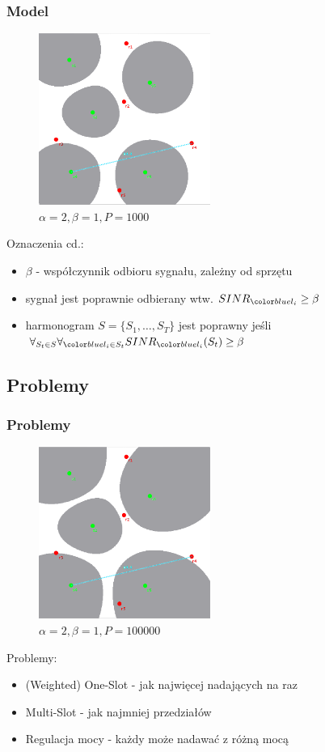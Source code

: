 \documentclass[polish, t,10pt]{beamer}
\begin{document}
    \begin{frame}
        \frametitle{Model}
        \begin{figure}
            \includegraphics[width=0.5\textwidth]{pictures/model-diagram3.png}
            \caption{$\alpha=2, \beta=1, P=1000$}
        \end{figure}
        Oznaczenia cd.:
        \begin{itemize}
            \item $\beta$ - współczynnik odbioru sygnału, zależny od sprzętu
            \item sygnał jest poprawnie odbierany wtw. $SINR_{\li} \geq \beta$
            \item harmonogram $S = \{S_1, \ldots, S_T\}$ jest poprawny jeśli $\forall_{S_t \in S} \forall_{\li \in S_t} SINR_{\li}(S_t) \geq \beta$
        \end{itemize}
    \end{frame}
\subsection{Problemy}
    \begin{frame}
        \frametitle{Problemy}
        \begin{figure}
            \includegraphics[width=0.5\textwidth]{pictures/model-diagram4.png}
            \caption{$\alpha=2, \beta=1, P=100000$}
        \end{figure}
        Problemy:
        \begin{itemize}
            \item (Weighted) One-Slot - jak najwięcej nadających na raz
            \item Multi-Slot - jak najmniej przedziałów
            \item Regulacja mocy - każdy może nadawać z różną mocą
        \end{itemize}
    \end{frame}
\end{document}
